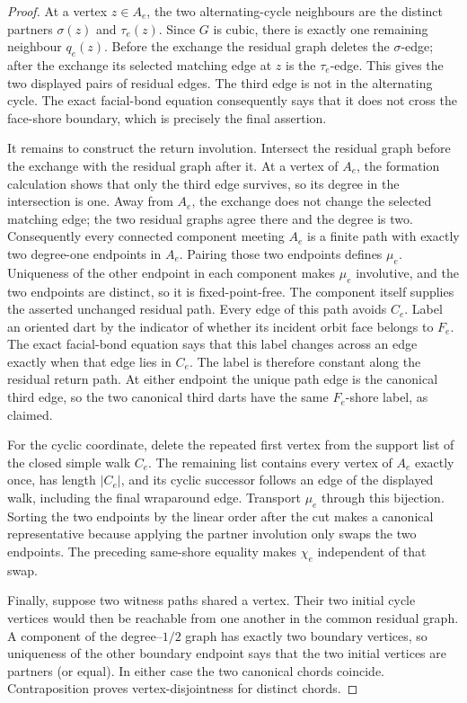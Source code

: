 \begin{proof}
At a vertex \(z\in A_e\), the two alternating-cycle neighbours are the
distinct partners \(\sigma(z)\) and \(\tau_e(z)\).  Since \(G\) is cubic,
there is exactly one remaining neighbour \(q_e(z)\).  Before the exchange the
residual graph deletes the \(\sigma\)-edge; after the exchange its selected
matching edge at \(z\) is the \(\tau_e\)-edge.  This gives the two displayed
pairs of residual edges.  The third edge is not in the alternating cycle.
The exact facial-bond equation consequently says that it does not cross the
face-shore boundary, which is precisely the final assertion.

It remains to construct the return involution.  Intersect the residual graph
before the exchange with the residual graph after it.  At a vertex of
\(A_e\), the formation calculation shows that only the third edge survives,
so its degree in the intersection is one.  Away from \(A_e\), the exchange
does not change the selected matching edge; the two residual graphs agree
there and the degree is two.  Consequently every connected component meeting
\(A_e\) is a finite path with exactly two degree-one endpoints in \(A_e\).
Pairing those two endpoints defines \(\mu_e\).  Uniqueness of the other
endpoint in each component makes \(\mu_e\) involutive, and the two endpoints
are distinct, so it is fixed-point-free.  The component itself supplies the
asserted unchanged residual path.  Every edge of this path avoids \(C_e\).
Label an oriented dart by the indicator of whether its incident orbit face
belongs to \(F_e\).  The exact facial-bond equation says that this label
changes across an edge exactly when that edge lies in \(C_e\).  The label is
therefore constant along the residual return path.  At either endpoint the
unique path edge is the canonical third edge, so the two canonical third
darts have the same \(F_e\)-shore label, as claimed.

For the cyclic coordinate, delete the repeated first vertex from the support
list of the closed simple walk \(C_e\).  The remaining list contains every
vertex of \(A_e\) exactly once, has length \(|C_e|\), and its cyclic successor
follows an edge of the displayed walk, including the final wraparound edge.
Transport \(\mu_e\) through this bijection.  Sorting the two endpoints by the
linear order after the cut makes a canonical representative because applying
the partner involution only swaps the two endpoints.  The preceding
same-shore equality makes \(\chi_e\) independent of that swap.

Finally, suppose two witness paths shared a vertex.  Their two initial cycle
vertices would then be reachable from one another in the common residual
graph.  A component of the degree--\(1/2\) graph has exactly two boundary
vertices, so uniqueness of the other boundary endpoint says that the two
initial vertices are partners (or equal).  In either case the two canonical
chords coincide.  Contraposition proves vertex-disjointness for distinct
chords.
\end{proof}

